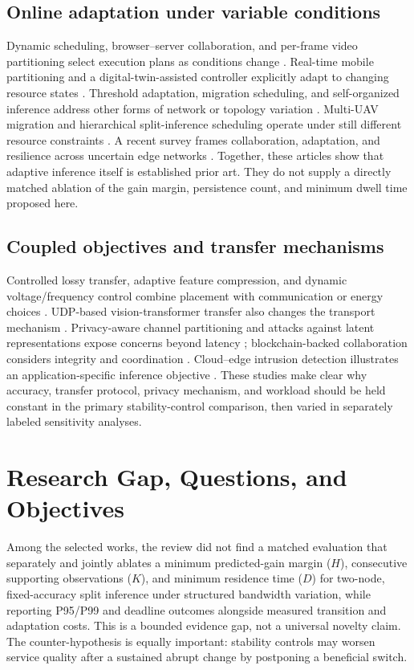 \documentclass[10pt,a4paper,twocolumn]{article}
\begin{document}
\subsection{Online adaptation under variable conditions}
Dynamic scheduling, browser--server collaboration, and per-frame video partitioning select execution plans as conditions change \cite{dids,nnweb,scissor}. Real-time mobile partitioning and a digital-twin-assisted controller explicitly adapt to changing resource states \cite{rap,digitaltwin}. Threshold adaptation, migration scheduling, and self-organized inference address other forms of network or topology variation \cite{uncertainty,migration,selforganized}. Multi-UAV migration and hierarchical split-inference scheduling operate under still different resource constraints \cite{uav,hierarchical}. A recent survey frames collaboration, adaptation, and resilience across uncertain edge networks \cite{resilience}. Together, these articles show that adaptive inference itself is established prior art. They do not supply a directly matched ablation of the gain margin, persistence count, and minimum dwell time proposed here.

\subsection{Coupled objectives and transfer mechanisms}
Controlled lossy transfer, adaptive feature compression, and dynamic voltage/frequency control combine placement with communication or energy choices \cite{copilot,feature,dvfo}. UDP-based vision-transformer transfer also changes the transport mechanism \cite{vitudp}. Privacy-aware channel partitioning and attacks against latent representations expose concerns beyond latency \cite{privguard,latentattacks}; blockchain-backed collaboration considers integrity and coordination \cite{cobc}. Cloud--edge intrusion detection illustrates an application-specific inference objective \cite{cecn}. These studies make clear why accuracy, transfer protocol, privacy mechanism, and workload should be held constant in the primary stability-control comparison, then varied in separately labeled sensitivity analyses.

\section{Research Gap, Questions, and Objectives}
Among the selected works, the review did not find a matched evaluation that separately and jointly ablates a minimum predicted-gain margin ($H$), consecutive supporting observations ($K$), and minimum residence time ($D$) for two-node, fixed-accuracy split inference under structured bandwidth variation, while reporting P95/P99 and deadline outcomes alongside measured transition and adaptation costs. This is a bounded evidence gap, not a universal novelty claim. The counter-hypothesis is equally important: stability controls may worsen service quality after a sustained abrupt change by postponing a beneficial switch.
\end{document}
